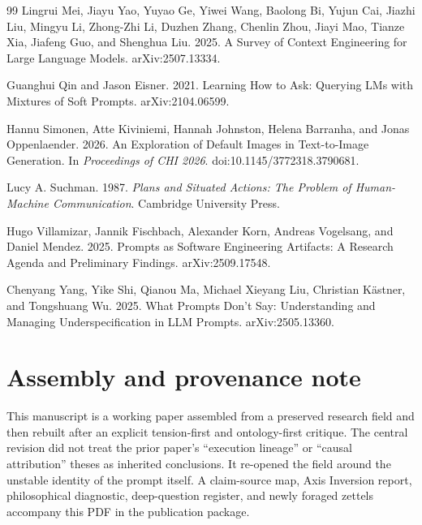 \documentclass[11pt]{article}
\begin{document}
\begin{thebibliography}{99}
Lingrui Mei, Jiayu Yao, Yuyao Ge, Yiwei Wang, Baolong Bi, Yujun Cai, Jiazhi Liu, Mingyu Li, Zhong-Zhi Li, Duzhen Zhang, Chenlin Zhou, Jiayi Mao, Tianze Xia, Jiafeng Guo, and Shenghua Liu. 2025.
\newblock A Survey of Context Engineering for Large Language Models.
\newblock arXiv:2507.13334.

Guanghui Qin and Jason Eisner. 2021.
\newblock Learning How to Ask: Querying LMs with Mixtures of Soft Prompts.
\newblock arXiv:2104.06599.

Hannu Simonen, Atte Kiviniemi, Hannah Johnston, Helena Barranha, and Jonas Oppenlaender. 2026.
\newblock An Exploration of Default Images in Text-to-Image Generation.
\newblock In \emph{Proceedings of CHI 2026}. doi:10.1145/3772318.3790681.

Lucy A. Suchman. 1987.
\newblock \emph{Plans and Situated Actions: The Problem of Human-Machine Communication}.
\newblock Cambridge University Press.

Hugo Villamizar, Jannik Fischbach, Alexander Korn, Andreas Vogelsang, and Daniel Mendez. 2025.
\newblock Prompts as Software Engineering Artifacts: A Research Agenda and Preliminary Findings.
\newblock arXiv:2509.17548.

Chenyang Yang, Yike Shi, Qianou Ma, Michael Xieyang Liu, Christian K\"astner, and Tongshuang Wu. 2025.
\newblock What Prompts Don't Say: Understanding and Managing Underspecification in LLM Prompts.
\newblock arXiv:2505.13360.
\end{thebibliography}

\appendix
\section{Assembly and provenance note}
This manuscript is a working paper assembled from a preserved research field and then rebuilt after an explicit tension-first and ontology-first critique. The central revision did not treat the prior paper's ``execution lineage'' or ``causal attribution'' theses as inherited conclusions. It re-opened the field around the unstable identity of the prompt itself. A claim-source map, Axis Inversion report, philosophical diagnostic, deep-question register, and newly foraged zettels accompany this PDF in the publication package.
\end{document}
